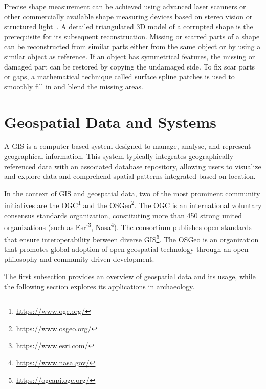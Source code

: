 Precise shape measurement can be achieved using advanced laser scanners or other commercially available shape measuring devices based on stereo 
vision or structured light~\cite{7801178}. A detailed triangulated \gls{3D} model of a corrupted shape is the prerequisite for its subsequent reconstruction. 
Missing or scarred parts of a shape can be reconstructed from similar parts either from the same
object or by using a similar object as reference. If an object has symmetrical features, the missing or damaged part can be restored by copying the undamaged side.
To fix scar parts or gaps, a mathematical technique called surface spline patches is used to smoothly fill in and blend the missing areas.

\section{Geospatial Data and Systems}
\label{sec:geographic_information_system}

A \acrfull{GIS} is a computer-based system designed to manage, analyse, and represent geographical information. 
This system typically integrates geographically referenced data with an associated database repository, allowing users to visualize and explore data and comprehend spatial patterns integrated based on location.~\cite{natgeo_2024}

In the context of \gls{GIS} and geospatial data, two of the most prominent community initiatives are the \gls{OGC}\footnote{\url{https://www.ogc.org/}} and the \gls{OSGeo}\footnote{\url{https://www.osgeo.org/}}.  
The \gls{OGC} is an international voluntary consensus standards organization, constituting more than 450 strong united organizations (such as Esri\footnote{\url{https://www.esri.com/}}, Nasa\footnote{\url{https://www.nasa.gov/}}). The consortium publishes open standards that ensure interoperability between diverse \gls{GIS}\footnote{\url{https://ogcapi.ogc.org/}}.
The \gls{OSGeo} is an organization that promotes global adoption of open geospatial technology through an open philosophy and community driven development. 

The first subsection provides an overview of geospatial data and its usage, while the following section explores its applications in archaeology.

